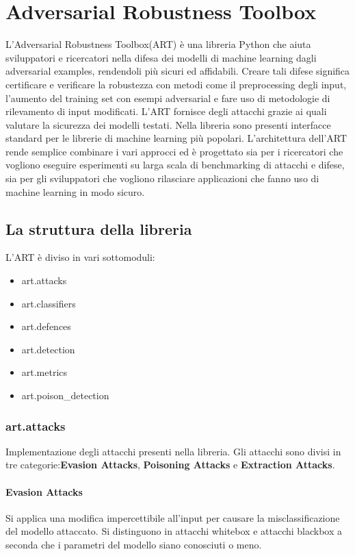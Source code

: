 \newpage
\section{Adversarial Robustness Toolbox}\cite{art2018}
L'Adversarial Robustness Toolbox(ART) è una libreria Python che aiuta sviluppatori e ricercatori nella difesa dei modelli di machine learning dagli adversarial examples, rendendoli più sicuri 
ed affidabili. Creare tali difese significa certificare e verificare la robustezza con metodi come il preprocessing degli input,  l'aumento del training set
con esempi adversarial e fare uso di metodologie di rilevamento di input modificati. L'ART fornisce degli attacchi grazie ai quali valutare la sicurezza dei modelli
testati. Nella libreria sono presenti interfacce standard per le librerie di machine learning più popolari. L'architettura dell'ART rende semplice combinare i vari approcci  ed è progettato sia per i ricercatori che vogliono eseguire esperimenti su larga scala di benchmarking di attacchi e difese, sia per gli sviluppatori 
che vogliono rilasciare applicazioni che fanno uso di machine learning in modo sicuro.
\subsection{La struttura della libreria}
L'ART è diviso in vari sottomoduli:
\begin{itemize}
    \item art.attacks
    \item art.classifiers
    \item art.defences
    \item art.detection
    \item art.metrics
    \item art.poison\_detection
\end{itemize}

\subsubsection{art.attacks}
Implementazione degli attacchi presenti nella libreria. Gli attacchi sono divisi in tre categorie:\textbf{Evasion Attacks},
\textbf{Poisoning Attacks} e \textbf{Extraction Attacks}.
\paragraph{Evasion Attacks}
Si applica una modifica impercettibile all'input per causare la misclassificazione  del modello attaccato. Si distinguono in attacchi whitebox  e attacchi blackbox a seconda che i parametri del modello
siano conosciuti o meno.

